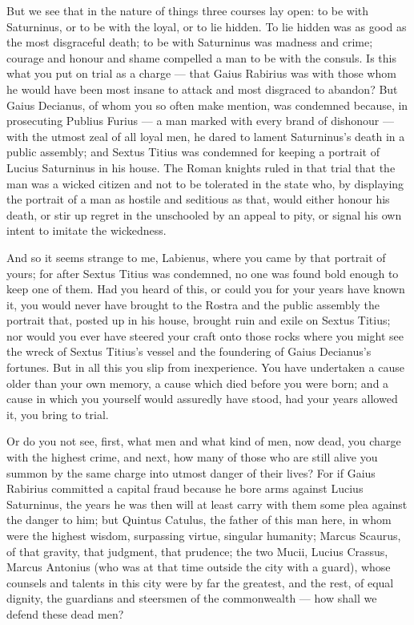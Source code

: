  But we see that in the nature of things three courses lay open: to be with Saturninus, or to be with the loyal, or to lie hidden. To lie hidden was as good as the most disgraceful death; to be with Saturninus was madness and crime; courage and honour and shame compelled a man to be with the consuls. Is this what you put on trial as a charge --- that Gaius Rabirius was with those whom he would have been most insane to attack and most disgraced to abandon? But Gaius Decianus, of whom you so often make mention, was condemned because, in prosecuting Publius Furius --- a man marked with every brand of dishonour --- with the utmost zeal of all loyal men, he dared to lament Saturninus's death in a public assembly; and Sextus Titius was condemned for keeping a portrait of Lucius Saturninus in his house. The Roman knights ruled in that trial that the man was a wicked citizen and not to be tolerated in the state who, by displaying the portrait of a man as hostile and seditious as that, would either honour his death, or stir up regret in the unschooled by an appeal to pity, or signal his own intent to imitate the wickedness.

 And so it seems strange to me, Labienus, where you came by that portrait of yours; for after Sextus Titius was condemned, no one was found bold enough to keep one of them. Had you heard of this, or could you for your years have known it, you would never have brought to the Rostra and the public assembly the portrait that, posted up in his house, brought ruin and exile on Sextus Titius; nor would you ever have steered your craft onto those rocks where you might see the wreck of Sextus Titius's vessel and the foundering of Gaius Decianus's fortunes. But in all this you slip from inexperience. You have undertaken a cause older than your own memory, a cause which died before you were born; and a cause in which you yourself would assuredly have stood, had your years allowed it, you bring to trial.

 Or do you not see, first, what men and what kind of men, now dead, you charge with the highest crime, and next, how many of those who are still alive you summon by the same charge into utmost danger of their lives? For if Gaius Rabirius committed a capital fraud because he bore arms against Lucius Saturninus, the years he was then will at least carry with them some plea against the danger to him; but Quintus Catulus, the father of this man here, in whom were the highest wisdom, surpassing virtue, singular humanity; Marcus Scaurus, of that gravity, that judgment, that prudence; the two Mucii, Lucius Crassus, Marcus Antonius (who was at that time outside the city with a guard), whose counsels and talents in this city were by far the greatest, and the rest, of equal dignity, the guardians and steersmen of the commonwealth --- how shall we defend these dead men?

